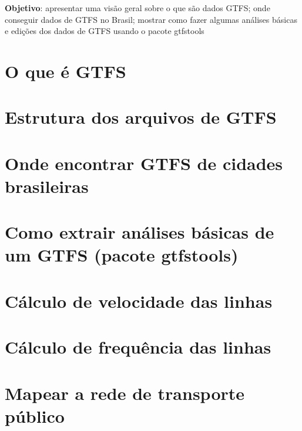 \documentclass[
  letterpaper,
  DIV=11,
  numbers=noendperiod]{scrreprt}
\begin{document}
\textbf{Objetivo}: apresentar uma visão geral sobre o que são dados
GTFS; onde conseguir dados de GTFS no Brasil; mostrar como fazer algumas
análises básicas e edições dos dados de GTFS usando o pacote gtfstools

\hypertarget{o-que-uxe9-gtfs}{%
\section{O que é GTFS}\label{o-que-uxe9-gtfs}}

\hypertarget{estrutura-dos-arquivos-de-gtfs}{%
\section{Estrutura dos arquivos de
GTFS}\label{estrutura-dos-arquivos-de-gtfs}}

\hypertarget{onde-encontrar-gtfs-de-cidades-brasileiras}{%
\section{Onde encontrar GTFS de cidades
brasileiras}\label{onde-encontrar-gtfs-de-cidades-brasileiras}}

\hypertarget{como-extrair-anuxe1lises-buxe1sicas-de-um-gtfs-pacote-gtfstools}{%
\section{Como extrair análises básicas de um GTFS (pacote
gtfstools)}\label{como-extrair-anuxe1lises-buxe1sicas-de-um-gtfs-pacote-gtfstools}}

\hypertarget{cuxe1lculo-de-velocidade-das-linhas}{%
\section{Cálculo de velocidade das
linhas}\label{cuxe1lculo-de-velocidade-das-linhas}}

\hypertarget{cuxe1lculo-de-frequuxeancia-das-linhas}{%
\section{Cálculo de frequência das
linhas}\label{cuxe1lculo-de-frequuxeancia-das-linhas}}

\hypertarget{mapear-a-rede-de-transporte-puxfablico}{%
\section{Mapear a rede de transporte
público}\label{mapear-a-rede-de-transporte-puxfablico}}
\end{document}
